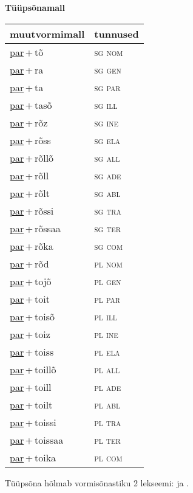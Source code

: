 
\vspace{1.8em}
\begin{minipage}{\textwidth}
\textbf{Tüüpsõnamall \,}\\

\begin{sideways}
\begin{tabular}{l l}
muutvormimall & tunnused \\
\hline
\underline{par}\,+\,tõ & \textsc{ sg nom } \\
\underline{par}\,+\,ra & \textsc{ sg gen } \\
\underline{par}\,+\,ta & \textsc{ sg par } \\
\underline{par}\,+\,tasõ & \textsc{ sg ill } \\
\underline{par}\,+\,rõz & \textsc{ sg ine } \\
\underline{par}\,+\,rõss & \textsc{ sg ela } \\
\underline{par}\,+\,rõllõ & \textsc{ sg all } \\
\underline{par}\,+\,rõll & \textsc{ sg ade } \\
\underline{par}\,+\,rõlt & \textsc{ sg abl } \\
\underline{par}\,+\,rõssi & \textsc{ sg tra } \\
\underline{par}\,+\,rõssaa & \textsc{ sg ter } \\
\underline{par}\,+\,rõka & \textsc{ sg com } \\
\underline{par}\,+\,rõd & \textsc{ pl nom } \\
\underline{par}\,+\,tojõ & \textsc{ pl gen } \\
\underline{par}\,+\,toit & \textsc{ pl par } \\
\underline{par}\,+\,toisõ & \textsc{ pl ill } \\
\underline{par}\,+\,toiz & \textsc{ pl ine } \\
\underline{par}\,+\,toiss & \textsc{ pl ela } \\
\underline{par}\,+\,toillõ & \textsc{ pl all } \\
\underline{par}\,+\,toill & \textsc{ pl ade } \\
\underline{par}\,+\,toilt & \textsc{ pl abl } \\
\underline{par}\,+\,toissi & \textsc{ pl tra } \\
\underline{par}\,+\,toissaa & \textsc{ pl ter } \\
\underline{par}\,+\,toika & \textsc{ pl com } \\
\end{tabular}
\end{sideways}
\label{tab:tüüpsõnamall-partõ}

\end{minipage}

 
\vspace{1em}
\noindent Tüüpsõna hõlmab vormisõnastiku 2 lekseemi:  ja .
